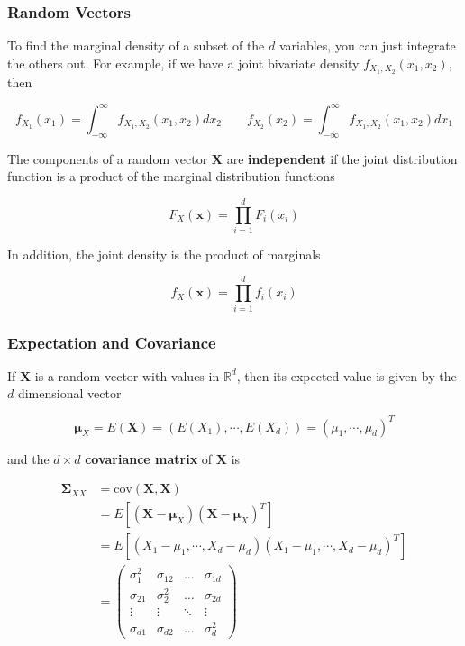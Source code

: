 \documentclass{beamer}
\begin{document}
\begin{frame}
\frametitle{Random Vectors}
To find the marginal density of a subset of the $d$ variables, you can just integrate the others out.  For example, if we have a joint bivariate density $f_{X_1,X_2}(x_1, x_2)$, then 

$$f_{X_1}(x_1) = \int_{-\infty}^{\infty} f_{X_1,X_2}(x_1, x_2) dx_2 \qquad f_{X_2}(x_2) = \int_{-\infty}^{\infty} f_{X_1,X_2}(x_1, x_2) dx_1$$

The components of a random vector $\mathbf{X}$ are \textbf{independent} if the joint distribution function is a product of the marginal distribution functions

$$F_X(\mathbf{x}) = \prod_{i=1}^d F_i(x_i)$$

In addition, the joint density is the product of marginals

$$f_X(\mathbf{x}) = \prod_{i=1}^d f_i(x_i)$$
\end{frame}

\begin{frame}
\frametitle{Expectation and Covariance}
If $\mathbf{X}$ is a random vector with values in $\mathbb{R}^d$, then its expected value is given by the $d$ dimensional vector

$$\mathbf{\mu}_X = E(\mathbf{X}) = (E(X_1), \cdots, E(X_d)) = (\mu_1, \cdots, \mu_d)^T$$

and the $d \times d$ \textbf{covariance matrix} of $\mathbf{X}$ is 

\begin{align*}
\mathbf{\Sigma}_{XX} &= \text{cov}(\mathbf{X}, \mathbf{X}) \\
&= E[(\mathbf{X} - \mathbf{\mu}_X)(\mathbf{X} - \mathbf{\mu}_X)^T]\\
&= E[(X_1 - \mu_1, \cdots, X_d - \mu_d) (X_1 - \mu_1, \cdots, X_d - \mu_d)^T]\\
&= 
\begin{pmatrix}
    \sigma_1^2 & \sigma_{12} & \dots  & \sigma_{1d}\\
    \sigma_{21} & \sigma_2^2  & \dots  & \sigma_{2d}\\
    \vdots & \vdots  & \ddots & \vdots \\
    \sigma_{d1} & \sigma_{d2}  & \dots  & \sigma_d^2
\end{pmatrix}
\end{align*} 
\end{frame}
\end{document}
